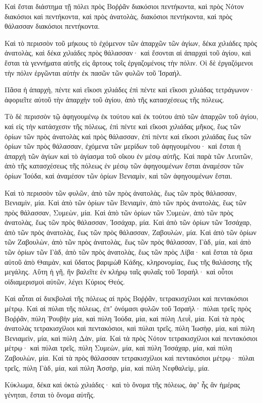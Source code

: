 {Καὶ ἔσται διάστημα τῇ πόλει πρὸς Βοῤῥᾶν διακόσιοι πεντήκοντα, καὶ πρὸς Νότον διακόσιοι καὶ πεντήκοντα, καὶ πρὸς ἀνατολὰς, διακόσιοι πεντήκοντα, καὶ πρὸς θάλασσαν διακόσιοι πεντήκοντα.
\par }{\PP {}Καὶ τὸ περισσὸν τοῦ μήκους τὸ ἐχόμενον τῶν ἀπαρχῶν τῶν ἁγίων, δέκα χιλιάδες πρὸς ἀνατολὰς, καὶ δέκα χιλιάδες πρὸς θάλασσαν· καὶ ἔσονται αἱ ἀπαρχαὶ τοῦ ἁγίου, καὶ ἔσται τὰ γεννήματα αὐτῆς εἰς ἄρτους τοῖς ἐργαζομένοις τὴν πόλιν.
Οἱ δὲ ἐργαζόμενοι τὴν πόλιν ἐργῶνται αὐτὴν ἐκ πασῶν τῶν φυλῶν τοῦ Ἰσραήλ.
\par }{\PP {}Πᾶσα ἡ ἀπαρχὴ, πέντε καὶ εἴκοσι χιλιάδες ἐπὶ πέντε καὶ εἴκοσι χιλιάδας τετράγωνον· ἀφοριεῖτε αὐτοῦ τὴν ἀπαρχὴν τοῦ ἁγίου, ἀπὸ τῆς κατασχέσεως τῆς πόλεως.
\par }{\PP {}Τὸ δὲ περισσὸν τῷ ἀφηγουμένῳ ἐκ τούτου καὶ ἐκ τούτου ἀπὸ τῶν ἀπαρχῶν τοῦ ἁγίου, καὶ εἰς τὴν κατάσχεσιν τῆς πόλεως, ἐπὶ πέντε καὶ εἴκοσι χιλιάδας μῆκος, ἕως τῶν ὁρίων τῶν πρὸς ἀνατολὰς καὶ πρὸς θάλασσαν, ἐπὶ πέντε καὶ εἴκοσι χιλιάδας ἕως τῶν ὁρίων τῶν πρὸς θάλασσαν, ἐχόμενα τῶν μερίδων τοῦ ἀφηγουμένου· καὶ ἔσται ἡ ἀπαρχὴ τῶν ἁγίων καὶ τὸ ἁγίασμα τοῦ οἴκου ἐν μέσῳ αὐτῆς.
Καὶ παρὰ τῶν Λευιτῶν, ἀπὸ τῆς κατασχέσεως τῆς πόλεως ἐν μέσῳ τῶν ἀφηγουμένων ἔσται ἀναμέσον τῶν ὁρίων Ἰούδα, καὶ ἀναμέσον τῶν ὁρίων Βενιαμὶν, καὶ τῶν ἀφηγουμένων ἔσται.
\par }{\PP {}Καὶ τὸ περισσὸν τῶν φυλῶν, ἀπὸ τῶν πρὸς ἀνατολὰς, ἕως τῶν πρὸς θάλασσαν, Βενιαμὶν, μία.
Καὶ ἀπὸ τῶν ὁρίων τῶν Βενιαμὶν, ἀπὸ τῶν πρὸς ἀνατολὰς, ἕως τῶν πρὸς θάλασσαν, Συμεὼν, μία.
Καὶ ἀπὸ τῶν ὁρίων τῶν Συμεὼν, ἀπὸ τῶν πρὸς ἀνατολὰς, ἕως τῶν πρὸς θάλασσαν, Ἰσσάχαρ, μία.
Καὶ ἀπὸ τῶν ὁρίων τῶν Ἰσσάχαρ, ἀπὸ τῶν πρὸς ἀνατολὰς, ἕως τῶν πρὸς θάλασσαν, Ζαβουλὼν, μία.
Καὶ ἀπὸ τῶν ὁρίων τῶν Ζαβουλὼν, ἀπὸ τῶν πρὸς ἀνατολὰς, ἕως τῶν πρὸς θάλασσαν, Γὰδ, μία,
καὶ ἀπὸ τῶν ὁρίων τῶν Γὰδ, ἀπὸ τῶν πρὸς ἀνατολὰς, ἕως τῶν πρὸς Λίβα· καὶ ἔσται τὰ ὅρια αὐτοῦ ἀπὸ Θαιμὰν, καὶ ὕδατος βαριμὼθ Κάδης, κληρονομίας, ἕως τῆς θαλάσσης τῆς μεγάλης.
Αὕτη ἡ γῆ, ἣν βαλεῖτε ἐν κλήρῳ ταῖς φυλαῖς τοῦ Ἰσραήλ· καὶ οὗτοι οἱδιαμερισμοὶ αὐτῶν, λέγει Κύριος Θεός.
\par }{\PP {}Καὶ αὗται αἱ διεκβολαὶ τῆς πόλεως αἱ πρὸς Βοῤῥᾶν, τετρακισχίλιοι καὶ πεντακόσιοι μέτρῳ.
Καὶ αἱ πύλαι τῆς πόλεως, ἐπʼ ὀνόμασι φυλῶν τοῦ Ἰσραήλ· πύλαι τρεῖς πρὸς Βοῤῥᾶν, πύλη Ῥουβὴν μία, καὶ πύλη Ἰούδα, μία, καὶ πύλη Λευῒ, μία.
Καὶ τὰ πρὸς ἀνατολὰς τετρακισχίλιοι καὶ πεντακόσιοι, καὶ πύλαι τρεῖς, πύλη Ἰωσὴφ, μία, καὶ πύλη Βενιαμεὶν, μία, καὶ πύλη Δὰν, μία.
Καὶ τὰ πρὸς Νότον τετρακισχίλιοι καὶ πεντακόσιοι μέτρῳ· καὶ πύλαι τρεῖς, πύλη Συμεὼν, μία, καὶ πύλη Ἰσσάχαρ, μία, καὶ πύλη Ζαβουλὼν, μία.
Καὶ τὰ πρὸς θάλασσαν τετρακισχίλιοι καὶ πεντακόσιοι μέτρῳ· πύλαι τρεῖς, πύλη Γὰδ, μία, καὶ πύλη Ἀσσὴρ, μία, καὶ πύλη Νεφθαλεὶμ, μία.
\par }{\PP {}Κύκλωμα, δέκα καὶ ὀκτὼ χιλιάδες· καὶ τὸ ὄνομα τῆς πόλεως, ἀφʼ ἧς ἂν ἡμέρας γένηται, ἔσται τὸ ὄνομα αὐτῆς.
\par }